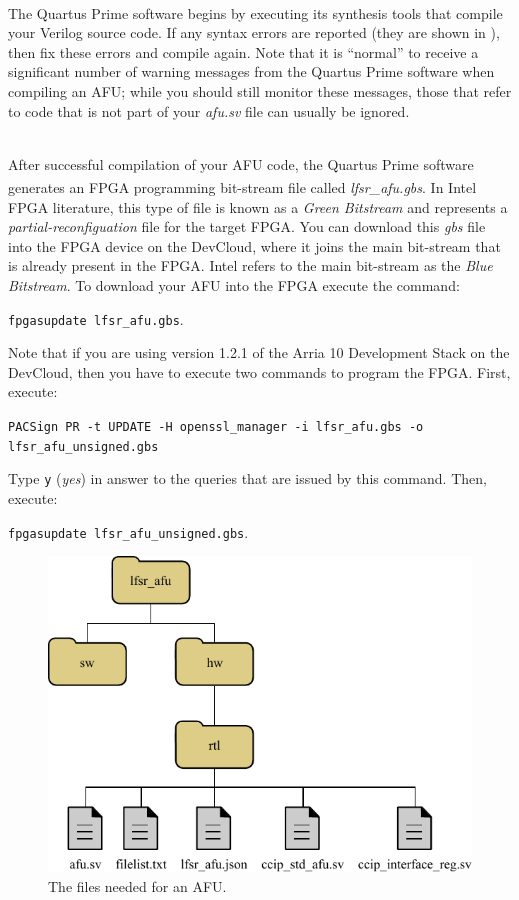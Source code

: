 \documentclass[epsfig,10pt,fullpage]{article}
\begin{document}
\begin{enumerate}
~\\
\noindent
The Quartus Prime software begins by executing its synthesis tools that
compile your Verilog source code. If any syntax errors are reported (they are shown in 
), then fix these errors and compile again. Note that it is 
``normal'' to receive a significant number of warning messages from the Quartus Prime 
software when compiling an AFU; while you should still monitor these messages, those that
refer to code that is not part of your {\it afu.sv} file can usually be ignored.

~\\
\noindent
After successful compilation of your AFU code, the Quartus Prime software generates an FPGA 
programming bit-stream file called {\it lfsr\_afu.gbs}. In Intel\textsuperscript{\textregistered}
FPGA literature, this type of file is known as a {\it Green Bitstream} and represents a 
{\it partial-reconfiguation} file for the target FPGA. You can download this {\it gbs} file 
into the FPGA device on the DevCloud, where it joins the main bit-stream that is 
already present in the FPGA. Intel refers to the main bit-stream as the {\it Blue Bitstream}. 
To download your AFU into the FPGA execute the command:

\noindent
\texttt{fpgasupdate lfsr\_afu.gbs}.

Note that if you are using version 1.2.1 of the Arria 10 Development Stack on the
DevCloud, then you have to execute two commands to program the FPGA. First, execute:

\noindent
\texttt{PACSign PR -t UPDATE -H openssl\_manager -i lfsr\_afu.gbs -o lfsr\_afu\_unsigned.gbs}

\noindent Type \texttt{y} ({\it yes}) in answer to the queries that are issued by this command. 
Then, execute:

\noindent
\texttt{fpgasupdate lfsr\_afu\_unsigned.gbs}.
\end{enumerate}

\begin{figure}[t]
   \begin{center}
       \includegraphics[]{figures/files.pdf}
   \end{center}
   \caption{The files needed for an AFU.}
	\label{fig:files}
\end{figure}
\end{document}
